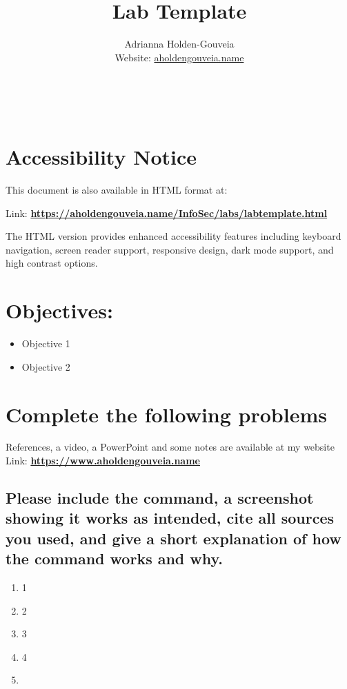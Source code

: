 \documentclass[12pt]{article}
\title{Lab Template}
\author{
        Adrianna Holden-Gouveia \\
        Website: \href{https://aholdengouveia.name}{aholdengouveia.name}\\ 
        \date{\vspace{-5ex}}
        \faGithub {: aholdengouveia} \\
        \faTwitter {: aholdengouveia} \\
        }
\begin{document}
    

\maketitle

\section*{Accessibility Notice}
This document is also available in HTML format at:

Link: \href{https://aholdengouveia.name/InfoSec/labs/labtemplate.html}{\textbf{https://aholdengouveia.name/InfoSec/labs/labtemplate.html}}

The HTML version provides enhanced accessibility features including keyboard navigation, screen reader support, responsive design, dark mode support, and high contrast options.



\section*{Objectives:}
\begin{itemize}
    \item Objective 1
    \item Objective 2
\end{itemize}
\section*{Complete the following problems}

References, a video, a PowerPoint and some notes are available at my website
Link: \href{https://www.aholdengouveia.name}{\textbf{https://www.aholdengouveia.name}}

\subsection*{Please include the command, a screenshot showing it works as intended, cite all sources you used, and give a short explanation of how the command works and why.}
    \begin{enumerate}
        \item 1
        \item 2
        \item 3
        \item 4
        \item 


    \end{enumerate}
\end{document}
